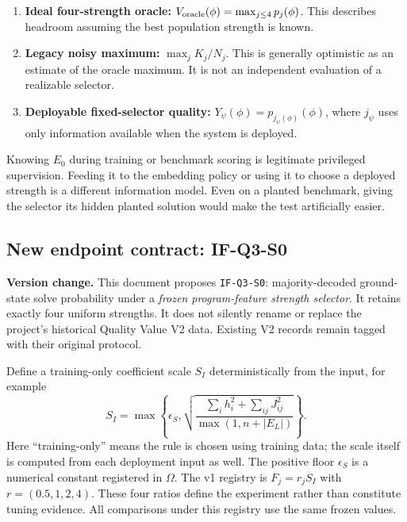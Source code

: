 \documentclass[11pt,a4paper]{article}
\newcommand{\code}[1]{\texttt{\small #1}}
\theoremstyle{definition}\newtheorem{definition}[proposition]{Definition}
\begin{document}
\begin{enumerate}
\item \textbf{Ideal four-strength oracle:} $V_{\rm oracle}(\phi)=\max_{j\le4}p_j(\phi)$. This describes headroom assuming the best population strength is known.
\item \textbf{Legacy noisy maximum:} $\max_j K_j/N_j$. This is generally optimistic as an estimate of the oracle maximum. It is not an independent evaluation of a realizable selector.
\item \textbf{Deployable fixed-selector quality:} $Y_\psi(\phi)=p_{j_\psi(\phi)}(\phi)$, where $j_\psi$ uses only information available when the system is deployed.
\end{enumerate}
Knowing $E_0$ during training or benchmark scoring is legitimate privileged supervision. Feeding it to the embedding policy or using it to choose a deployed strength is a different information model. Even on a planted benchmark, giving the selector its hidden planted solution would make the test artificially easier.

\subsection{New endpoint contract: IF-Q3-S0}
\begin{decisionbox}
\textbf{Version change.} This document proposes \code{IF-Q3-S0}: majority-decoded ground-state solve probability under a \emph{frozen program-feature strength selector}. It retains exactly four uniform strengths. It does not silently rename or replace the project's historical Quality Value V2 data. Existing V2 records remain tagged with their original protocol.
\end{decisionbox}

Define a training-only coefficient scale $S_I$ deterministically from the input, for example
\begin{equation}
S_I=\max\left\{\epsilon_S,\sqrt{\frac{\sum_i h_i^2+\sum_{ij}J_{ij}^2}{\max(1,n+|E_L|)}}\right\}.
\end{equation}
Here ``training-only'' means the rule is chosen using training data; the scale itself is computed from each deployment input as well. The positive floor $\epsilon_S$ is a numerical constant registered in $\Omega$. The v1 registry is $F_j=r_jS_I$ with $r=(0.5,1,2,4)$. These four ratios define the experiment rather than constitute tuning evidence. All comparisons under this registry use the same frozen values.
\end{document}
